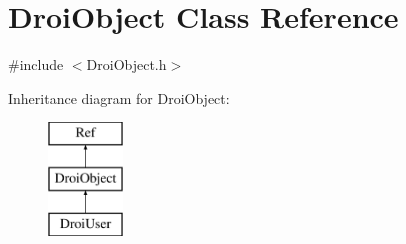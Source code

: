 \hypertarget{class_droi_object}{}\section{Droi\+Object Class Reference}
\label{class_droi_object}


{\ttfamily \#include $<$Droi\+Object.\+h$>$}

Inheritance diagram for Droi\+Object\+:\begin{figure}[H]
\begin{center}
\leavevmode
\includegraphics[height=3.000000cm]{de/dec/class_droi_object}
\end{center}
\end{figure}
